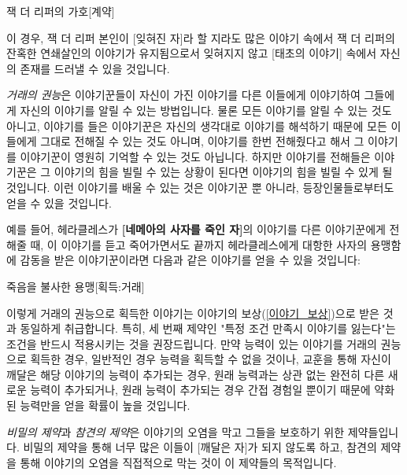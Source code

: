 \documentclass{report}
\begin{document}
	\begin{story}{잭 더 리퍼의 가호}{[계약]}
	\end{story}
	
	이 경우, 잭 더 리퍼 본인이 [잊혀진 자]라 할 지라도 많은 이야기 속에서 잭 더 리퍼의 잔혹한 연쇄살인의 이야기가 유지됨으로서 잊혀지지 않고 [태초의 이야기] 속에서 자신의 존재를 드러낼 수 있을 것입니다.
	
	\smallskip
	
	\emph{거래의 권능}은 이야기꾼들이 자신이 가진 이야기를 다른 이들에게 이야기하여 그들에게 자신의 이야기를 알릴 수 있는 방법입니다. 물론 모든 이야기를 알릴 수 있는 것도 아니고, 이야기를 들은 이야기꾼은 자신의 생각대로 이야기를 해석하기 때문에 모든 이들에게 그대로 전해질 수 있는 것도 아니며, 이야기를 한번 전해줬다고 해서 그 이야기를 이야기꾼이 영원히 기억할 수 있는 것도 아닙니다. 하지만 이야기를 전해들은 이야기꾼은 그 이야기의 힘을 빌릴 수 있는 상황이 된다면 이야기의 힘을 빌릴 수 있게 될 것입니다. 이런 이야기를 배울 수 있는 것은 이야기꾼 뿐 아니라, 등장인물들로부터도 얻을 수 있을 것입니다.
	
	예를 들어, 헤라클레스가 \textbf{[네메아의 사자를 죽인 자]}의 이야기를 다른 이야기꾼에게 전해줄 때, 이 이야기를 듣고 죽어가면서도 끝까지 헤라클레스에게 대항한 사자의 용맹함에 감동을 받은 이야기꾼이라면 다음과 같은 이야기를 얻을 수 있을 것입니다:
	
	\begin{story}{죽음을 불사한 용맹}{[획득:거래]}
		
	\end{story}
	
	이렇게 거래의 권능으로 획득한 이야기는 이야기의 보상(\ref{이야기_보상})으로 받은 것과 동일하게 취급합니다. 특히, 세 번째 제약인 "특정 조건 만족시 이야기를 잃는다"는 조건을 반드시 적용시키는 것을 권장드립니다. 만약 능력이 있는 이야기를 거래의 권능으로 획득한 경우, 일반적인 경우 능력을 획득할 수 없을 것이나, 교훈을 통해 자신이 깨달은 해당 이야기의 능력이 추가되는 경우, 원래 능력과는 상관 없는 완전히 다른 새로운 능력이 추가되거나, 원래 능력이 추가되는 경우 간접 경험일 뿐이기 때문에 약화된 능력만을 얻을 확률이 높을 것입니다.
	
	\smallskip
	
	\emph{비밀의 제약}과 \emph{참견의 제약}은 이야기의 오염을 막고 그들을 보호하기 위한 제약들입니다. 비밀의 제약을 통해 너무 많은 이들이 [깨달은 자]가 되지 않도록 하고, 참견의 제약을 통해 이야기의 오염을 직접적으로 막는 것이 이 제약들의 목적입니다.
	
\end{document}
